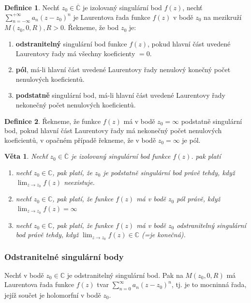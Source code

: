 \documentclass[a4]{report}
\newtheorem{theorem}{Věta}
\theoremstyle{definition}
\newtheorem{definition}{Definice}[section]
\begin{document}
\begin{definition}
Nechť $z_0\in \overline{\mathbb{C}}$ je izolovaný  singulární bod $f(z)$, nechť $\sum_{n=-\infty}^{+\infty}a_n(z-z_0)^n$ je Laurentova řada funkce $f(z)$ v bodě $z_0$ na mezikruží $M(z_0,0,R), R>0$. Řekneme, že bod $z_0$ je: 
\begin{enumerate}
\item \textbf{odstranitelný} singulární bod funkce $f(z)$, pokud hlavní část uvedené Laurentovy řady má všechny koeficienty $=0$.
\item \textbf{pól}, má-li hlavní část uvedené Laurentovy řady nenulový konečný počet nenulových koeficientů.
\item \textbf{podstatně} singulární bod, má-li hlavní část uvedené Laurentovy řady nekonečný počet nenulových koeficientů.
\end{enumerate}
\end{definition}

\begin{definition}
Řekneme, že funkce $f(z)$ má v bodě $z_0=\infty$ podstatně singulární bod, pokud hlavní část Laurentovy řady má nekonečný počet nenulových koeficientů, v opačném případě řekneme, že v bodě $z_0=\infty$ je pól.
\end{definition}

\begin{theorem}
Nechť $z_0\in \overline{\mathbb{C}}$ je izolovaný singulární bod funkce $f(z)$. pak platí
\begin{enumerate}
\item nechť $z_0\in\mathbb{C}$, pak platí, že $z_0$ je podstatně singulární bod právě tehdy, když $\lim_{z\rightarrow z_0}f(z)$ neexistuje.
\item nechť $z_0\in\mathbb{C}$, pak platí, že funkce $f(z)$ má v bodě $z_0$ pól právě, když $\lim_{z\rightarrow z_0}f(z)=\infty$
\item nechť $z_0\in\mathbb{C}$, pak platí, že funkce $f(z)$ má v bodě $z_0$ odstranitelný singulární bod právě tehdy, když $\lim_{z\rightarrow z_0}f(z)\in\mathbb{C}$ (=je konečná).
\end{enumerate}
\end{theorem}

\subsubsection{Odstranitelné singulární body}
Nechť v bodě $z_0\in\mathbb{C}$ je odstranitelný singulární bod. Pak na $M(z_0,0,R)$ má Laurentova řada funkce $f(z)$ tvar $\sum_{n=0}^{\infty}a_n(z-z_0)^n$, tj. je to mocninná řada, jejíž součet je holomorfní v bodě $z_0$. 
\end{document}
